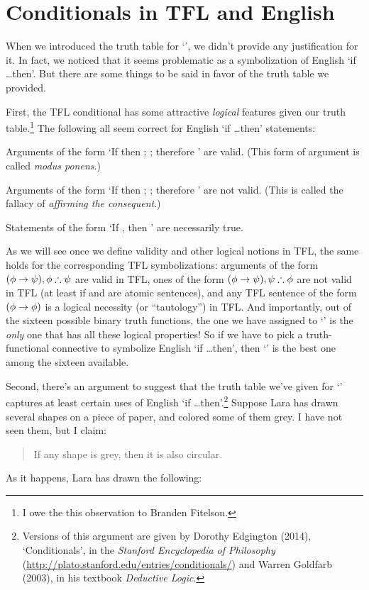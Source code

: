 \section{Conditionals in TFL and English}\label{s:TFLConditional}

When we introduced the truth table for `\eif', we didn't provide any justification for it.  In fact, we noticed that it seems problematic as a symbolization of English `if \ldots then'.  But there are some things to be said in favor of the truth table we provided.


First, the TFL conditional has some attractive \emph{logical} features given our truth table.\footnote{I owe the this observation to Branden Fitelson.}  The following all seem correct for English `if \ldots then' statements:
\begin{ebullet}
\item Arguments of the form `If \meta{\phi} then \meta{\psi}; \meta{\phi}; therefore \meta{\psi}' are valid.  (This form of argument is called \emph{modus ponens}.)
\item Arguments of the form `If \meta{\phi} then \meta{\psi}; \meta{\psi}; therefore \meta{\phi}' are not valid.  (This is called the fallacy of \emph{affirming the consequent}.)
\item Statements of the form `If \meta{\phi}, then \meta{\phi}' are necessarily true.
\end{ebullet}
As we will see once we define validity and other logical notions in TFL, the same holds for the corresponding TFL symbolizations: arguments of the form $(\mathcal{\phi} \rightarrow \mathcal{\psi}), \mathcal{\phi} \therefore \mathcal{\psi}$ are valid in TFL, ones of the form $(\mathcal{\phi} \rightarrow \mathcal{\psi}), \mathcal{\psi} \therefore \mathcal{\phi}$ are not valid in TFL (at least if \meta{\phi} and \meta{\psi} are atomic sentences), and any TFL sentence of the form $(\mathcal{\phi} \rightarrow \mathcal{\phi})$ is a logical necessity (or ``tautology'') in TFL.  And importantly, out of the sixteen possible binary truth functions, the one we have assigned to `\eif' is the \emph{only} one that has all these logical properties!  So if we have to pick a truth-functional connective to symbolize English `if \ldots then', then `\eif' is the best one among the sixteen available.

Second, there's an argument to suggest that the truth table we've given for `\eif' captures at least certain uses of English `if \ldots then'.\footnote{Versions of this argument are given by Dorothy Edgington (2014), `Conditionals', in the \emph{Stanford Encyclopedia of Philosophy} (\url{http://plato.stanford.edu/entries/conditionals/}) and Warren Goldfarb (2003), in his textbook \emph{Deductive Logic}.}    Suppose Lara has drawn several shapes on a piece of paper, and colored some of them grey. I have not seen them, but I claim:
	\begin{quote}
		If any shape is grey, then it is also circular.
	\end{quote}
As it happens, Lara has drawn the following:

